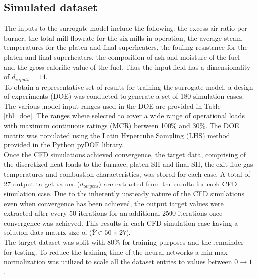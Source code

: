 \documentclass[a4paper,fleqn]{cas-dc}
\begin{document}
\subsection{Simulated dataset}
The inputs to the surrogate model include the following: the excess air ratio per burner, the total mill flowrate for the six mills in operation, the average steam temperatures for the platen and final superheaters, the fouling resistance for the platen and final superheaters, the composition of ash and moisture of the fuel and the gross calorific value of the fuel. Thus the input field has a dimensionality of $d_{inputs}=14$.\\

To obtain a representative set of results for training the surrogate model, a design of experiments (DOE) was conducted to generate a set of 180 simulation cases. The various model input ranges used in the DOE are provided in Table \ref{tbl_doe}. The ranges where selected to cover a wide range of operational loads with maximum continuous ratings (MCR) between 100\% and 30\%. The DOE matrix was populated using the Latin Hypercube Sampling (LHS) method provided in the Python pyDOE library.\\

Once the CFD simulations achieved convergence, the target data, comprising of the discretized heat loads to the furnace, platen SH and final SH, the exit flue-gas temperatures and combustion characteristics, was stored for each case. A total of 27 output target values ($d_{targets}$) are extracted from the results for each CFD simulation case. Due to the inherently unsteady nature of the CFD simulations even when convergence has been achieved, the output target values were extracted after every 50 iterations for an additional 2500 iterations once convergence was achieved. This results in each CFD simulation case having a solution data matrix size of ($\bar{Y}\in50\times27$).\\

The target dataset was split with 80\% for training purposes and the remainder for testing. To reduce the training time of the neural networks a min-max normalization was utilized to scale all the dataset entries to values between $0\rightarrow1$.\\
\end{document}
